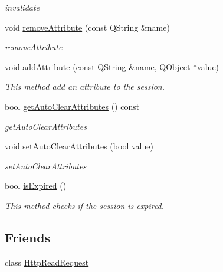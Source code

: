 \begin{DoxyCompactItemize}
\begin{DoxyCompactList}\small\item\em invalidate \end{DoxyCompactList}\item 
void \hyperlink{class_c_w_f_1_1_http_session_aa2c8fba3e49fd8c43c601d81bf964650}{remove\+Attribute} (const Q\+String \&name)
\begin{DoxyCompactList}\small\item\em remove\+Attribute \end{DoxyCompactList}\item 
void \hyperlink{class_c_w_f_1_1_http_session_a65d09f84231715c5d2cdba2d3aca7626}{add\+Attribute} (const Q\+String \&name, Q\+Object $\ast$value)
\begin{DoxyCompactList}\small\item\em This method add an attribute to the session. \end{DoxyCompactList}\item 
bool \hyperlink{class_c_w_f_1_1_http_session_ae43896253d871a2786ed5a8450b1b644}{get\+Auto\+Clear\+Attributes} () const 
\begin{DoxyCompactList}\small\item\em get\+Auto\+Clear\+Attributes \end{DoxyCompactList}\item 
void \hyperlink{class_c_w_f_1_1_http_session_a12f419d327a704a5daf3e53f72671626}{set\+Auto\+Clear\+Attributes} (bool value)
\begin{DoxyCompactList}\small\item\em set\+Auto\+Clear\+Attributes \end{DoxyCompactList}\item 
bool \hyperlink{class_c_w_f_1_1_http_session_aebc716e79896ed61527ff4dac933558e}{is\+Expired} ()
\begin{DoxyCompactList}\small\item\em This method checks if the session is expired. \end{DoxyCompactList}\end{DoxyCompactItemize}
\subsection*{Friends}
\begin{DoxyCompactItemize}
\item 
class \hyperlink{class_c_w_f_1_1_http_session_a4d54f5003e07e218070a449c22a52c7c}{Http\+Read\+Request}
\end{DoxyCompactItemize}


